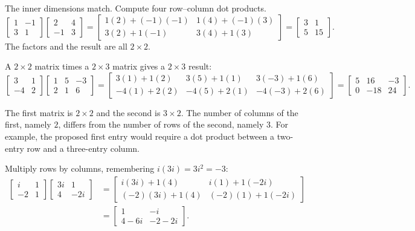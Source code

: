 \idea The inner dimensions match. Compute four row--column dot products.
\[
\begin{bmatrix}1&-1\\3&1\end{bmatrix}
\begin{bmatrix}2&4\\-1&3\end{bmatrix}
=\begin{bmatrix}1(2)+(-1)(-1)&1(4)+(-1)(3)\\
3(2)+1(-1)&3(4)+1(3)\end{bmatrix}
=\boxed{\begin{bmatrix}3&1\\5&15\end{bmatrix}}.
\]
The factors and the result are all $2\times2$.

A $2\times2$ matrix times a $2\times3$ matrix gives a $2\times3$ result:
\[
\begin{bmatrix}3&1\\-4&2\end{bmatrix}
\begin{bmatrix}1&5&-3\\2&1&6\end{bmatrix}
=\begin{bmatrix}
3(1)+1(2)&3(5)+1(1)&3(-3)+1(6)\\
-4(1)+2(2)&-4(5)+2(1)&-4(-3)+2(6)
\end{bmatrix}
=\boxed{\begin{bmatrix}5&16&-3\\0&-18&24\end{bmatrix}}.
\]

The first matrix is $2\times2$ and the second is $3\times2$. The number of
columns of the first, namely $2$, differs from the number of rows of the
second, namely $3$. For example, the proposed first entry would require a
dot product between a two-entry row and a three-entry column.

Multiply rows by columns, remembering $i(3i)=3i^2=-3$:
\begin{align*}
\begin{bmatrix}i&1\\-2&1\end{bmatrix}
\begin{bmatrix}3i&1\\4&-2i\end{bmatrix}
&=\begin{bmatrix}i(3i)+1(4)&i(1)+1(-2i)\\
(-2)(3i)+1(4)&(-2)(1)+1(-2i)\end{bmatrix}\\
&=\boxed{\begin{bmatrix}1&-i\\4-6i&-2-2i\end{bmatrix}}.
\end{align*}

